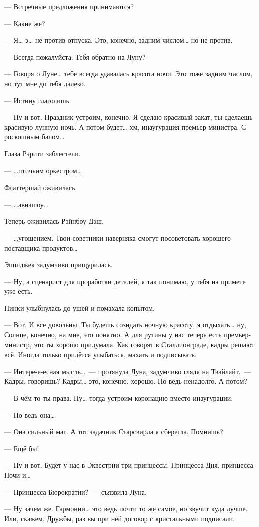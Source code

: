 \documentclass[twoside,a5paper,12pt]{extbook}
\begin{document}
— Встречные предложения принимаются?

— Какие же?

— Я… э… не против отпуска. Это, конечно, задним числом… но не против.

— Всегда пожалуйста. Тебя обратно на Луну?

— Говоря о Луне… тебе всегда удавалась красота ночи. Это тоже задним числом, но тут мне до тебя далеко.

— Истину глаголишь.

— Ну и вот. Праздник устроим, конечно. Я сделаю красивый закат, ты сделаешь красивую лунную ночь. А потом будет… хм, инаугурация премьер-министра. С роскошным балом…

Глаза Рэрити заблестели.

— …птичьим оркестром…

Флаттершай оживилась.

— …авиашоу…

Теперь оживилась Рэйнбоу Дэш.

— …угощением. Твои советники наверняка смогут посоветовать хорошего поставщика продуктов…

Эпплджек задумчиво прищурилась.

— Ну, а сценарист для проработки деталей, я так понимаю, у тебя на примете уже есть.

Пинки улыбнулась до ушей и помахала копытом.

— Вот. И все довольны. Ты будешь созидать ночную красоту, я отдыхать… ну, Солнце, конечно, на мне, это понятно. А для рутины у нас теперь есть премьер-министр, это ты хорошо придумала. Как говорят в Сталлионграде, кадры решают всё. Иногда только придётся улыбаться, махать и подписывать. 

— Интере-е-есная мысль… — протянула Луна, задумчиво глядя на Твайлайт. — Кадры, говоришь? Кадры… это, конечно, хорошо. Но ведь ненадолго. А потом?

— В чём-то ты права. Ну… тогда устроим коронацию вместо инаугурации.

— Но ведь она…

— Она сильный маг. А тот задачник Старсвирла я сберегла. Помнишь?

— Ещё бы!

— Ну и вот. Будет у нас в Эквестрии три принцессы. Принцесса Дня, принцесса Ночи и…

— Принцесса Бюрократии? — съязвила Луна.

— Ну зачем же. Гармонии… это ведь почти то же самое, но звучит куда лучше. Или, скажем, Дружбы, раз вы при ней договор с кристальными подписали.
\end{document}
